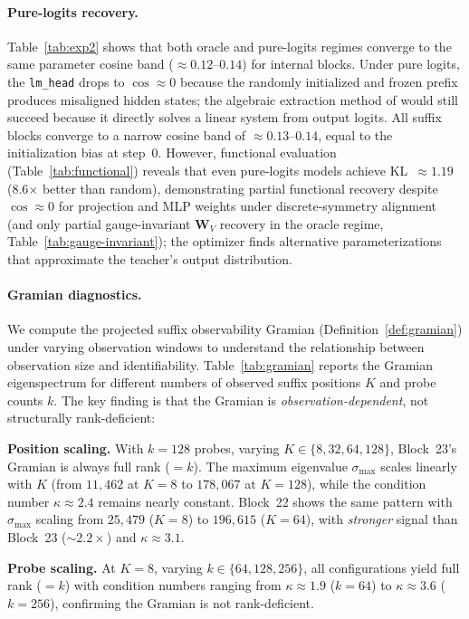 \documentclass{article}
\newcommand{\bW}{\mathbf{W}}
\begin{document}
\paragraph{Pure-logits recovery.}
Table~\ref{tab:exp2} shows that both oracle and pure-logits regimes converge to the same parameter cosine band ($\approx 0.12$--$0.14$) for internal blocks.  Under pure logits, the \texttt{lm\_head} drops to $\cos \approx 0$ because the randomly initialized and frozen prefix produces misaligned hidden states; the algebraic extraction method of \citet{carlini2024stealing} would still succeed because it directly solves a linear system from output logits.  All suffix blocks converge to a narrow cosine band of $\approx 0.13$--$0.14$, equal to the initialization bias at step~0.  However, functional evaluation (Table~\ref{tab:functional}) reveals that even pure-logits models achieve KL~$\approx 1.19$ (8.6$\times$ better than random), demonstrating partial functional recovery despite $\cos \approx 0$ for projection and MLP weights under discrete-symmetry alignment (and only partial gauge-invariant $\bW_V$ recovery in the oracle regime, Table~\ref{tab:gauge-invariant}); the optimizer finds alternative parameterizations that approximate the teacher's output distribution.

\paragraph{Gramian diagnostics.}
We compute the projected suffix observability Gramian (Definition~\ref{def:gramian}) under varying observation windows to understand the relationship between observation size and identifiability.  Table~\ref{tab:gramian} reports the Gramian eigenspectrum for different numbers of observed suffix positions $K$ and probe counts $k$.  The key finding is that the Gramian is \emph{observation-dependent}, not structurally rank-deficient:

\textbf{Position scaling.}  With $k{=}128$ probes, varying $K \in \{8, 32, 64, 128\}$, Block~23's Gramian is always full rank ($= k$).  The maximum eigenvalue $\sigma_{\max}$ scales linearly with $K$ (from $11{,}462$ at $K{=}8$ to $178{,}067$ at $K{=}128$), while the condition number $\kappa \approx 2.4$ remains nearly constant.  Block~22 shows the same pattern with $\sigma_{\max}$ scaling from $25{,}479$ ($K{=}8$) to $196{,}615$ ($K{=}64$), with \emph{stronger} signal than Block~23 ($\sim 2.2\times$) and $\kappa \approx 3.1$.

\textbf{Probe scaling.}  At $K{=}8$, varying $k \in \{64, 128, 256\}$, all configurations yield full rank ($= k$) with condition numbers ranging from $\kappa \approx 1.9$ ($k{=}64$) to $\kappa \approx 3.6$ ($k{=}256$), confirming the Gramian is not rank-deficient.
\end{document}
